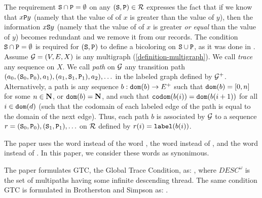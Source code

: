 \documentclass{lmcs}
\begin{document}
The requirement ${\tt S} \cap {\tt P} = \emptyset$ 
on any $({\tt S},{\tt P}) \in {\mathcal R}$ expresses the fact that
if we know that $x {\tt P} y$ (namely that
the value of of $x$ is greater than the value of $y$), then the information
$x {\tt S} y$ (namely that the value of of $x$ is greater \emph{or equal} 
than the value of $y$) becomes redundant and we remove it from our records.
The condition ${\tt S} \cap {\tt P} = \emptyset$ is required for
$({\tt S},{\tt P})$ to define a bicoloring on ${\tt S} \cup {\tt P}$, as it was done in
\cite{Lee1}.
\\

Assume ${\mathcal G} = (V,E,X)$ is any multigraph (\ref{definition-multigraph}). 
We call \emph{trace} any sequence on $X$. 
We call \emph{path} on ${\mathcal G}$ 
any transition path $(a_0,({\tt S}_0,{\tt P}_0),a_1), (a_1,{\tt S}_1,{\tt P}_1),a_2), \ldots$
in the labeled graph defined by ${\mathcal G}^+$.
Alternatively, a path is any sequence $b:{\tt dom}(b) \rightarrow E^+$ such that ${\tt dom}(b) = [0,n]$ 
for some $n \in {\bf N}$, or ${\tt dom} (b)={\bf N}$, and such that ${\tt codom}(b(i)) = {\tt dom}(b(i+1))$
for all $i \in {\tt dom}(d)$ (such that the codomain of each labeled edge of the path is equal
to the domain of the next edge).
Thus, each path $b$ is associated by ${\mathcal G}$ to a sequence 
$r = ({\tt S}_0,{\tt P}_0), ({\tt S}_1,{\tt P}_1), \ldots$ on ${\mathcal R}$ defined by $r(i) = {\tt label}(b(i))$. 

The paper \cite{Lee1}
uses the word  instead of the word  ,
the word  instead of ,
and the word   instead of .
In this paper, we consider these words as synonimous.

The paper \cite{Lee1} formulates GTC, the Global Trace Condition,
as: , 
where $DESC^\omega$ is the set of multipaths having some infinite descending thread.
The same condition GTC  is formulated in Brotherston and Simpson as: 
.


\end{document}
